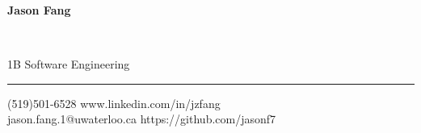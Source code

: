 \documentclass[10pt]{article}
\begin{document}
\thispagestyle{empty}

\begin{center}
\begin{LARGE}\textbf{Jason Fang}\end{LARGE}\\
\vspace{2pt}
\begin{normalsize}1B Software Engineering\end{normalsize} 
\vspace{-10pt}
\end{center}

\rule{475pt}{1pt}
(519)501-6528 \hspace{3.95in} www.linkedin.com/in/jzfang\\ 
jason.fang.1@uwaterloo.ca\hspace{3.3in} https://github.com/jasonf7\\
\vspace{12pt}
\end{document}
